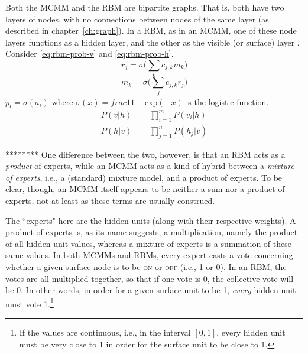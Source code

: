 Both the \ac{MCMM} and the \ac{RBM} are bipartite graphs.
That is, both have two layers of nodes, with no connections between nodes of the 
same layer (as described in chapter~\ref{ch:graph}).  In a RBM, as in an \ac{MCMM}, 
one of these node layers functions as a hidden layer, and the other as the visible 
(or surface) layer \citep[see, e.g.,][]{mohamed-and-hinton:2010}. 
Consider \eqref{eq:rbm-prob-v} and \eqref{eq:rbm-prob-h}.
\begin{equation}\label{rbm:act-v}
r_j = \sigma\big(\sum_{k} c_{j,k} m_{k}\big)
\end{equation}
\begin{equation}\label{rbm:act-h}
m_k =\sigma\big(\sum_{j} c_{j,k} r_{j}\big)
\end{equation}
$p_i =\sigma(a_{i})$
where $\sigma(x)=frac{1}{1+\text{exp}(-x)}$ is the logistic function. 
\begin{align}
P(v|h) &= \prod_{i=1}^m P(v_i|h)  \label{eq:rbm-prob-v}\\
P(h|v) &= \prod_{j=1}^n P(h_j|v) \label{eq:rbm-prob-h}
\end{align}



 

********
One difference between 
the two, however, is that an RBM acts as a \emph{product} of experts, while an \ac{MCMM} 
acts as a kind of hybrid between a \emph{mixture of experts}, i.e., a (standard) mixture model, 
and a product of experts. To be clear, though, an \ac{MCMM} itself appears to be neither
 a sum nor a product of experts, not at least as these terms are usually construed. 


The ``experts" here 
are the hidden units (along with their
respective weights). A product of experts is, as its name suggests, a multiplication, 
namely the product of all hidden-unit values, whereas a mixture of experts is a 
summation of these same values. In both MCMMs and RBMs, every expert casts 
a vote concerning whether a given surface node is to be \textsc{on} or \textsc{off} 
(i.e., 1 or 0). In an RBM, the votes are all multiplied together, so that if one vote is 0, 
the collective vote will be 0. In other words, in order for a given surface unit to be 1, 
\emph{every} hidden unit must vote 1.\footnote{If the values are continuous, i.e., in 
the interval $[0,1]$, every hidden unit must be very close to 1 in order for the surface 
unit to be close to 1.}

